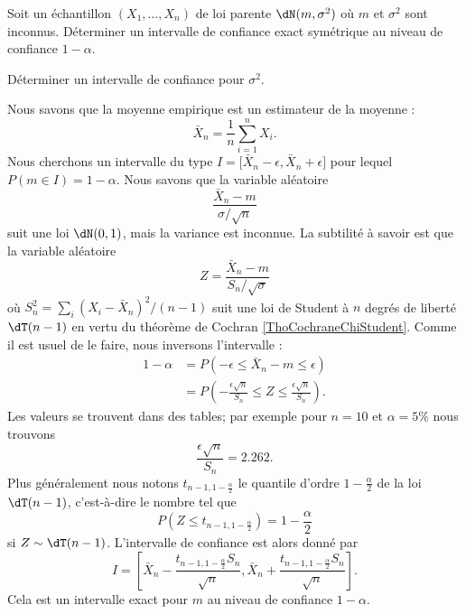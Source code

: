 \begin{example}

	Soit un échantillon \( (X_1,\ldots,X_n)\) de loi parente \( \dN(m,\sigma^2)\) où \( m\) et \( \sigma^2\) sont inconnus. Déterminer un intervalle de confiance exact symétrique au niveau de confiance \( 1-\alpha\).

	Déterminer un intervalle de confiance pour \( \sigma^2\).

	Nous savons que la moyenne empirique est un estimateur de la moyenne :
	\begin{equation}
		\bar X_n=\frac{1}{ n }\sum_{i=1}^nX_i.
	\end{equation}
	Nous cherchons un intervalle du type \( I=\mathopen[ \bar X_n-\epsilon , \bar X_n+\epsilon \mathclose]\) pour lequel \( P(m\in I)=1-\alpha\). Nous savons que la variable aléatoire
	\begin{equation}
		\frac{ \bar X_n-m }{ \sigma/\sqrt{n} }
	\end{equation}
	suit une loi \( \dN(0,1)\), mais la variance est inconnue. La subtilité à savoir est que la variable aléatoire
	\begin{equation}
		Z=\frac{ \bar X_n-m }{ S_n/\sqrt{\sigma} }
	\end{equation}
	où \( S_n^2=\sum_i(X_i-\bar X_n)^2/(n-1)\) suit une loi de Student à \( n\) degrés de liberté \( \dT(n-1)\) en vertu du théorème de Cochran \ref{ThoCochraneChiStudent}. Comme il est usuel de le faire, nous inversons l'intervalle :
	\begin{subequations}
		\begin{align}
			1-\alpha & =P\left( -\epsilon\leq \bar X_n-m\leq \epsilon \right)                                         \\
			         & =P\left( -\frac{ \epsilon\sqrt{n} }{ S_n }\leq Z\leq \frac{ \epsilon\sqrt{n} }{ S_n } \right).
		\end{align}
	\end{subequations}
	Les valeurs se trouvent dans des tables; par exemple pour \( n=10\) et \( \alpha=5\%\) nous trouvons
	\begin{equation}
		\frac{ \epsilon\sqrt{n} }{ S_n }=2.262.
	\end{equation}
	Plus généralement nous notons \( t_{n-1,1-\frac{ \alpha }{2}}\) le quantile d'ordre \( 1-\frac{ \alpha }{2}\) de la loi \( \dT(n-1)\), c'est-à-dire le nombre tel que
	\begin{equation}
		P(Z\leq t_{n-1,1-\frac{ \alpha }{2}})=1-\frac{ \alpha }{2}
	\end{equation}
	si \( Z\sim\dT(n-1)\). L'intervalle de confiance est alors donné par
	\begin{equation}
		I=\left[ \bar X_n-\frac{ t_{n-1,1-\frac{ \alpha }{2}}S_n }{ \sqrt{n} },\bar X_n+\frac{ t_{n-1,1-\frac{ \alpha }{2}}S_n }{ \sqrt{n} } \right].
	\end{equation}
	Cela est un intervalle exact pour \( m\) au niveau de confiance \( 1-\alpha\).


\end{example}
